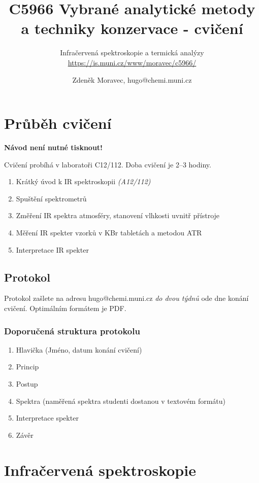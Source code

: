 \documentclass[12pt]{article}
\title{C5966 Vybrané analytické metody a techniky konzervace - cvičení}
\subtitle{Infračervená spektroskopie a termická analýzy\\ \url{https://is.muni.cz/www/moravec/c5966/}}
\author %
{Zdeněk Moravec, hugo@chemi.muni.cz}
\date{}
\begin{document}
\maketitle

\pagebreak

\section{Průběh cvičení}

	\textbf{Návod není nutné tisknout!}

	Cvičení probíhá v laboratoři C12/112. Doba cvičení je 2--3 hodiny.

	\begin{enumerate}
	\item Krátký úvod k IR spektroskopii \textit{(A12/112)}
	\item Spuštění spektrometrů
	\item Změření IR spektra atmosféry, stanovení vlhkosti uvnitř přístroje
	\item Měření IR spekter vzorků v KBr tabletách a metodou ATR
	\item Interpretace IR spekter
	\end{enumerate}

\subsection{Protokol}

Protokol zašlete na adresu hugo@chemi.muni.cz \textit{do dvou týdnů} ode dne konání cvičení. Optimálním formátem je PDF.

\subsubsection{Doporučená struktura protokolu}

	\begin{enumerate}
	\item Hlavička (Jméno, datum konání cvičení)
	\item Princip
	\item Postup
	\item Spektra (naměřená spektra studenti dostanou v textovém formátu)
	\item Interpretace spekter
	\item Závěr
	\end{enumerate}

\newpage
\section{Infračervená spektroskopie}
\end{document}
